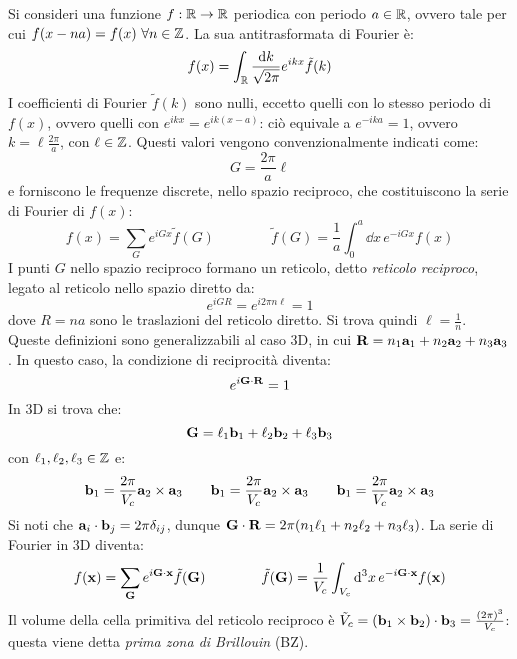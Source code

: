 Si consideri una funzione $ f : \mathbb{R} \rightarrow \mathbb{R} $ periodica con periodo $ a \in \mathbb{R} $, ovvero tale per cui $ f(x -na) = f(x) \,\,\forall n \in \mathbb{Z} $. La sua antitrasformata di Fourier è:
\begin{equation}
	f(x) = \int_{\mathbb{R}} \frac{\mathrm{d} k}{\sqrt{2\pi}} e^{ikx} \tilde{f}(k)
\end{equation}
I coefficienti di Fourier $ \tilde{f}(k) $ sono nulli, eccetto quelli con lo stesso periodo di $ f(x) $, ovvero quelli con $ e^{ikx} = e^{ik(x-a)} $: ciò equivale a $ e^{-ika} = 1 $, ovvero $ k = \ell \frac{2\pi}{a} $, con $ \ell \in \mathbb{Z} $. Questi valori vengono convenzionalmente indicati come:
\begin{equation}
	G = \frac{2\pi}{a} \ell
\end{equation}
e forniscono le frequenze discrete, nello spazio reciproco, che costituiscono la serie di Fourier di $ f(x) $:
\begin{equation}
	f(x) = \sum_G e^{iGx} \tilde{f}(G)
	\qquad \qquad
	\tilde{f}(G) = \frac{1}{a} \int_0^a \dd x\, e^{-i G x} f(x)
\end{equation}
I punti $ G $ nello spazio reciproco formano un reticolo, detto \textit{reticolo reciproco}, legato al reticolo nello spazio diretto da:
\begin{equation}
	e^{i G R} = e^{i 2\pi n \ell} = 1
\end{equation}
dove $ R = na $ sono le traslazioni del reticolo diretto. Si trova quindi $ \ell = \frac{1}{n} $. \\
Queste definizioni sono generalizzabili al caso 3D, in cui $ \mathbf{R} = n_1 \mathbf{a}_1 + n_2 \mathbf{a}_2 + n_3 \mathbf{a}_3 $. In questo caso, la condizione di reciprocità diventa:
\begin{equation}
	e^{i \mathbf{G} \cdot \mathbf{R}} = 1
	\label{eq:rec-ret}
\end{equation}
In 3D si trova che:
\begin{equation}
	\mathbf{G} = \ell_1 \mathbf{b}_1 + \ell_2 \mathbf{b}_2 + \ell_3 \mathbf{b}_3
\end{equation}
con $ \ell_1, \ell_2, \ell_3 \in \mathbb{Z} $ e:
\begin{equation}
	\mathbf{b}_1 = \frac{2\pi}{V_c} \mathbf{a}_2 \times \mathbf{a}_3
	\qquad
	\mathbf{b}_1 = \frac{2\pi}{V_c} \mathbf{a}_2 \times \mathbf{a}_3
	\qquad
	\mathbf{b}_1 = \frac{2\pi}{V_c} \mathbf{a}_2 \times \mathbf{a}_3
\end{equation}
Si noti che $ \mathbf{a}_i \cdot \mathbf{b}_j = 2\pi \delta_{ij} $, dunque $ \mathbf{G} \cdot \mathbf{R} = 2\pi (n_1 \ell_1 + n_2 \ell_2 + n_3 \ell_3) $. La serie di Fourier in 3D diventa:
\begin{equation}
	f(\mathbf{x}) = \sum_{\mathbf{G}} e^{i \mathbf{G} \cdot \mathbf{x}} \tilde{f}(\mathbf{G})
	\qquad \qquad
	\tilde{f}(\mathbf{G}) = \frac{1}{V_c} \int_{V_c} \mathrm{d}^3x\, e^{-i \mathbf{G} \cdot \mathbf{x}} f(\mathbf{x})
\end{equation}
Il volume della cella primitiva del reticolo reciproco è $ \tilde{V}_c = (\mathbf{b}_1 \times \mathbf{b}_2) \cdot \mathbf{b}_3 = \frac{(2\pi)^3}{V_c} $: questa viene detta \textit{prima zona di Brillouin} (BZ).


